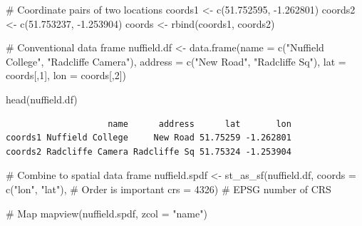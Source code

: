 \documentclass[
  letterpaper,
  DIV=11,
  numbers=noendperiod]{scrreprt}
\newenvironment{Shaded}{\begin{snugshade}}{\end{snugshade}}
\newcommand{\AttributeTok}[1]{\textcolor[rgb]{0.40,0.45,0.13}{#1}}
\newcommand{\CommentTok}[1]{\textcolor[rgb]{0.37,0.37,0.37}{#1}}
\newcommand{\DecValTok}[1]{\textcolor[rgb]{0.68,0.00,0.00}{#1}}
\newcommand{\FloatTok}[1]{\textcolor[rgb]{0.68,0.00,0.00}{#1}}
\newcommand{\FunctionTok}[1]{\textcolor[rgb]{0.28,0.35,0.67}{#1}}
\newcommand{\NormalTok}[1]{\textcolor[rgb]{0.00,0.23,0.31}{#1}}
\newcommand{\OtherTok}[1]{\textcolor[rgb]{0.00,0.23,0.31}{#1}}
\newcommand{\SpecialCharTok}[1]{\textcolor[rgb]{0.37,0.37,0.37}{#1}}
\newcommand{\StringTok}[1]{\textcolor[rgb]{0.13,0.47,0.30}{#1}}
\begin{document}
\begin{Shaded}
\begin{Highlighting}[]
\CommentTok{\# Coordinate pairs of two locations}
\NormalTok{coords1 }\OtherTok{\textless{}{-}} \FunctionTok{c}\NormalTok{(}\FloatTok{51.752595}\NormalTok{, }\SpecialCharTok{{-}}\FloatTok{1.262801}\NormalTok{)}
\NormalTok{coords2 }\OtherTok{\textless{}{-}} \FunctionTok{c}\NormalTok{(}\FloatTok{51.753237}\NormalTok{, }\SpecialCharTok{{-}}\FloatTok{1.253904}\NormalTok{)}
\NormalTok{coords }\OtherTok{\textless{}{-}} \FunctionTok{rbind}\NormalTok{(coords1, coords2)}

\CommentTok{\# Conventional data frame}
\NormalTok{nuffield.df }\OtherTok{\textless{}{-}} \FunctionTok{data.frame}\NormalTok{(}\AttributeTok{name =} \FunctionTok{c}\NormalTok{(}\StringTok{"Nuffield College"}\NormalTok{, }\StringTok{"Radcliffe Camera"}\NormalTok{),}
                          \AttributeTok{address =} \FunctionTok{c}\NormalTok{(}\StringTok{"New Road"}\NormalTok{, }\StringTok{"Radcliffe Sq"}\NormalTok{),}
                          \AttributeTok{lat =}\NormalTok{ coords[,}\DecValTok{1}\NormalTok{], }\AttributeTok{lon =}\NormalTok{ coords[,}\DecValTok{2}\NormalTok{])}

\FunctionTok{head}\NormalTok{(nuffield.df)}
\end{Highlighting}
\end{Shaded}

\begin{verbatim}
                    name      address      lat       lon
coords1 Nuffield College     New Road 51.75259 -1.262801
coords2 Radcliffe Camera Radcliffe Sq 51.75324 -1.253904
\end{verbatim}

\begin{Shaded}
\begin{Highlighting}[]
\CommentTok{\# Combine to spatial data frame}
\NormalTok{nuffield.spdf }\OtherTok{\textless{}{-}} \FunctionTok{st\_as\_sf}\NormalTok{(nuffield.df, }
                          \AttributeTok{coords =} \FunctionTok{c}\NormalTok{(}\StringTok{"lon"}\NormalTok{, }\StringTok{"lat"}\NormalTok{), }\CommentTok{\# Order is important}
                          \AttributeTok{crs =} \DecValTok{4326}\NormalTok{) }\CommentTok{\# EPSG number of CRS}

\CommentTok{\# Map}
\FunctionTok{mapview}\NormalTok{(nuffield.spdf, }\AttributeTok{zcol =} \StringTok{"name"}\NormalTok{)}
\end{Highlighting}
\end{Shaded}
\end{document}
